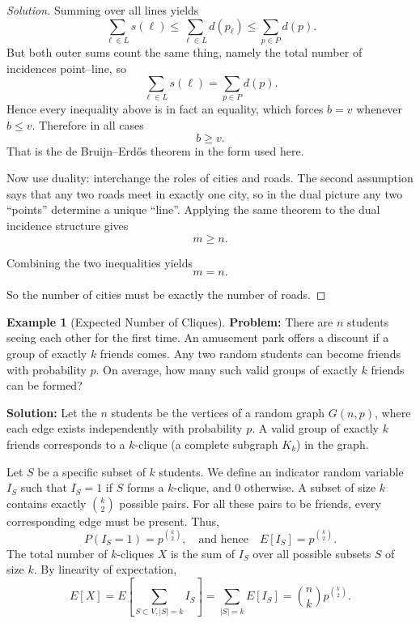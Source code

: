 \documentclass[11pt]{article}
\theoremstyle{definition}
\newtheorem{example}{Example}[section]
\begin{document}
\begin{proof}[Solution]
Summing over all lines yields
\[
\sum_{\ell\in L} s(\ell)
\le \sum_{\ell\in L} d(p_\ell)
\le \sum_{p\in P} d(p).
\]
But both outer sums count the same thing, namely the total number of incidences point--line, so
\[
\sum_{\ell\in L} s(\ell)=\sum_{p\in P} d(p).
\]
Hence every inequality above is in fact an equality, which forces $b=v$ whenever $b\le v$. Therefore in all cases
\[
b\ge v.
\]
That is the de Bruijn--Erd\H{o}s theorem in the form used here.

Now use duality: interchange the roles of cities and roads. The second assumption says that any two roads meet in exactly one city, so in the dual picture any two ``points'' determine a unique ``line''. Applying the same theorem to the dual incidence structure gives
\[
m \ge n.
\]

Combining the two inequalities yields
\[
\boxed{m=n}.
\]

So the number of cities must be exactly the number of roads.
\end{proof}

\begin{example}[Expected Number of Cliques]
\textbf{Problem:} There are $n$ students seeing each other for the first time. An amusement park offers a discount if a group of exactly $k$ friends comes. Any two random students can become friends with probability $p$. On average, how many such valid groups of exactly $k$ friends can be formed?

\textbf{Solution:} Let the $n$ students be the vertices of a random graph $G(n, p)$, where each edge exists independently with probability $p$. A valid group of exactly $k$ friends corresponds to a $k$-clique (a complete subgraph $K_k$) in the graph. 

Let $S$ be a specific subset of $k$ students. We define an indicator random variable $I_S$ such that $I_S = 1$ if $S$ forms a $k$-clique, and $0$ otherwise. A subset of size $k$ contains exactly $\binom{k}{2}$ possible pairs. For all these pairs to be friends, every corresponding edge must be present. Thus,
\[
    P(I_S = 1) = p^{\binom{k}{2}}, \quad \text{and hence} \quad E[I_S] = p^{\binom{k}{2}}.
\]
The total number of $k$-cliques $X$ is the sum of $I_S$ over all possible subsets $S$ of size $k$. By linearity of expectation,
\[
    E[X] = E\left[ \sum_{S \subset V, |S|=k} I_S \right] = \sum_{|S|=k} E[I_S] = \binom{n}{k} p^{\binom{k}{2}}.
\]
\end{example}
\end{document}
